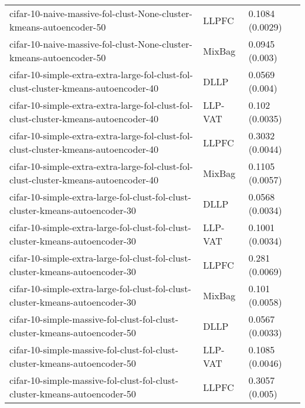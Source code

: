 \begin{longtable}{lll}
                                          cifar-10-naive-massive-fol-clust-None-cluster-kmeans-autoencoder-50 &     LLPFC &                           0.1084 (0.0029) \\
                                          cifar-10-naive-massive-fol-clust-None-cluster-kmeans-autoencoder-50 &    MixBag &                            0.0945 (0.003) \\
                          cifar-10-simple-extra-extra-large-fol-clust-fol-clust-cluster-kmeans-autoencoder-40 &      DLLP &                            0.0569 (0.004) \\
                          cifar-10-simple-extra-extra-large-fol-clust-fol-clust-cluster-kmeans-autoencoder-40 &   LLP-VAT &                            0.102 (0.0035) \\
                          cifar-10-simple-extra-extra-large-fol-clust-fol-clust-cluster-kmeans-autoencoder-40 &     LLPFC &                           0.3032 (0.0044) \\
                          cifar-10-simple-extra-extra-large-fol-clust-fol-clust-cluster-kmeans-autoencoder-40 &    MixBag &                           0.1105 (0.0057) \\
                                cifar-10-simple-extra-large-fol-clust-fol-clust-cluster-kmeans-autoencoder-30 &      DLLP &                           0.0568 (0.0034) \\
                                cifar-10-simple-extra-large-fol-clust-fol-clust-cluster-kmeans-autoencoder-30 &   LLP-VAT &                           0.1001 (0.0034) \\
                                cifar-10-simple-extra-large-fol-clust-fol-clust-cluster-kmeans-autoencoder-30 &     LLPFC &                            0.281 (0.0069) \\
                                cifar-10-simple-extra-large-fol-clust-fol-clust-cluster-kmeans-autoencoder-30 &    MixBag &                            0.101 (0.0058) \\
                                    cifar-10-simple-massive-fol-clust-fol-clust-cluster-kmeans-autoencoder-50 &      DLLP &                           0.0567 (0.0033) \\
                                    cifar-10-simple-massive-fol-clust-fol-clust-cluster-kmeans-autoencoder-50 &   LLP-VAT &                           0.1085 (0.0046) \\
                                    cifar-10-simple-massive-fol-clust-fol-clust-cluster-kmeans-autoencoder-50 &     LLPFC &                            0.3057 (0.005) \\

\end{longtable}
